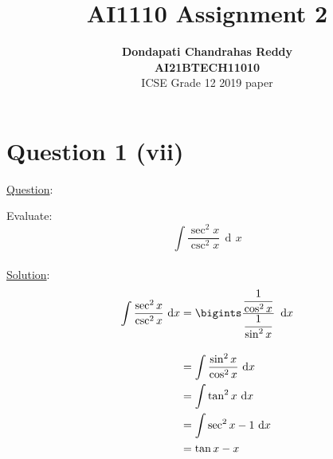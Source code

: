\documentclass[journal,12pt,twocolumn]{IEEEtran}
\DeclareMathOperator{\di}{d\!}
\begin{document}
\title{\textbf{AI1110 Assignment 2} }
\author{\textbf{Dondapati Chandrahas Reddy}\\\textbf{AI21BTECH11010}\\ ICSE Grade 12 2019 paper}
\maketitle

{\section{Question 1 (vii)\newline}}

{\large \underline{Question}:\newline}

Evaluate:
\begin{equation}
	\int \dfrac{\sec^2 x}{\csc^2 x} \,\di x 
\end{equation}\\

{\large \underline{Solution}:}\\

\begin{align}
	\int \dfrac{\sec^2 x}{\csc^2 x} \,\di x &= \bigints \dfrac{\dfrac{1}{\cos^2 x}}{\dfrac{1}{\sin^2 x}} \,\,\di x \\[1em]
	&= \int \dfrac{\sin^2 x}{\cos^2 x} \, \di x \\
	&= \int \tan^2 x \,\di x \\
	&= \int \sec^2 x-1 \,\di x \\
	&= \tan x - x
\end{align}
\end{document}
